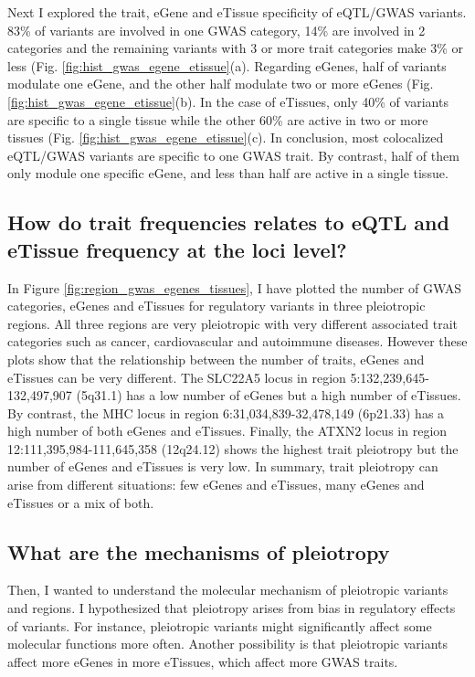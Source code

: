Next I explored the trait, eGene and eTissue specificity of eQTL/GWAS variants.
%
83\% of variants are involved in one GWAS category, 14\% are involved in 2 categories and the remaining variants with 3 or more trait categories make 3\% or less (Fig. \ref{fig:hist_gwas_egene_etissue}(a).
%
Regarding eGenes, half of variants modulate one eGene, and the other half modulate two or more eGenes (Fig. \ref{fig:hist_gwas_egene_etissue}(b).
%
In the case of eTissues, only 40\% of variants are specific to a single tissue while the other 60\% are active in two or more tissues (Fig. \ref{fig:hist_gwas_egene_etissue}(c).
%
In conclusion, most colocalized eQTL/GWAS variants are specific to one GWAS trait. By contrast, half of them only module one specific eGene, and less than half are active in a single tissue.

\subsection*{How do trait frequencies relates to eQTL and eTissue frequency at the loci level?}

In Figure \ref{fig:region_gwas_egenes_tissues}, I have plotted the number of GWAS categories, eGenes and eTissues for regulatory variants in three pleiotropic regions.
%
All three regions are very pleiotropic with very different associated trait categories such as cancer, cardiovascular and autoimmune diseases.
%
However these plots show that the relationship between the number of traits, eGenes and eTissues can be very different.
%
The SLC22A5 locus in region 5:132,239,645-132,497,907 (5q31.1) has a low number of eGenes but a high number of eTissues.
%
By contrast, the MHC locus in region 6:31,034,839-32,478,149 (6p21.33) has a high number of both eGenes and eTissues.
%
Finally, the ATXN2 locus in region 12:111,395,984-111,645,358 (12q24.12) shows the highest trait pleiotropy but the number of eGenes and eTissues is very low.
%
In summary, trait pleiotropy can arise from different situations: few eGenes and eTissues, many eGenes and eTissues or a mix of both.

\subsection*{What are the mechanisms of pleiotropy}

Then, I wanted to understand the molecular mechanism of pleiotropic variants and regions.
%
I hypothesized that pleiotropy arises from bias in regulatory effects of variants.
%
For instance, pleiotropic variants might significantly affect some molecular functions more often.
%
Another possibility is that pleiotropic variants affect more eGenes in more eTissues, which affect more GWAS traits.

